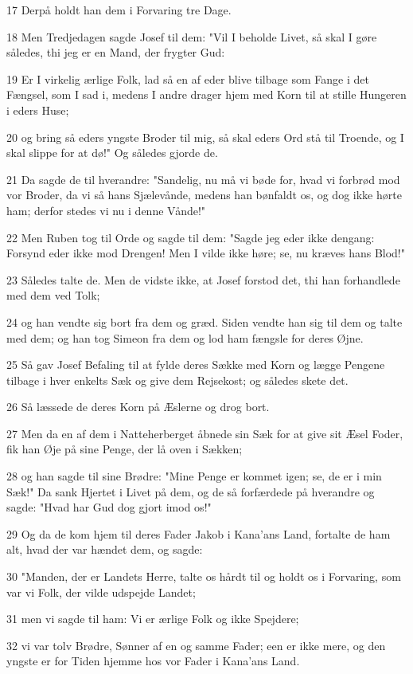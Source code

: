 \par 17 Derpå holdt han dem i Forvaring tre Dage.
\par 18 Men Tredjedagen sagde Josef til dem: "Vil I beholde Livet, så skal I gøre således, thi jeg er en Mand, der frygter Gud:
\par 19 Er I virkelig ærlige Folk, lad så en af eder blive tilbage som Fange i det Fængsel, som I sad i, medens I andre drager hjem med Korn til at stille Hungeren i eders Huse;
\par 20 og bring så eders yngste Broder til mig, så skal eders Ord stå til Troende, og I skal slippe for at dø!" Og således gjorde de.
\par 21 Da sagde de til hverandre: "Sandelig, nu må vi bøde for, hvad vi forbrød mod vor Broder, da vi så hans Sjælevånde, medens han bønfaldt os, og dog ikke hørte ham; derfor stedes vi nu i denne Vånde!"
\par 22 Men Ruben tog til Orde og sagde til dem: "Sagde jeg eder ikke dengang: Forsynd eder ikke mod Drengen! Men I vilde ikke høre; se, nu kræves hans Blod!"
\par 23 Således talte de. Men de vidste ikke, at Josef forstod det, thi han forhandlede med dem ved Tolk;
\par 24 og han vendte sig bort fra dem og græd. Siden vendte han sig til dem og talte med dem; og han tog Simeon fra dem og lod ham fængsle for deres Øjne.
\par 25 Så gav Josef Befaling til at fylde deres Sække med Korn og lægge Pengene tilbage i hver enkelts Sæk og give dem Rejsekost; og således skete det.
\par 26 Så læssede de deres Korn på Æslerne og drog bort.
\par 27 Men da en af dem i Natteherberget åbnede sin Sæk for at give sit Æsel Foder, fik han Øje på sine Penge, der lå oven i Sækken;
\par 28 og han sagde til sine Brødre: "Mine Penge er kommet igen; se, de er i min Sæk!" Da sank Hjertet i Livet på dem, og de så forfærdede på hverandre og sagde: "Hvad har Gud dog gjort imod os!"
\par 29 Og da de kom hjem til deres Fader Jakob i Kana'ans Land, fortalte de ham alt, hvad der var hændet dem, og sagde:
\par 30 "Manden, der er Landets Herre, talte os hårdt til og holdt os i Forvaring, som var vi Folk, der vilde udspejde Landet;
\par 31 men vi sagde til ham: Vi er ærlige Folk og ikke Spejdere;
\par 32 vi var tolv Brødre, Sønner af en og samme Fader; een er ikke mere, og den yngste er for Tiden hjemme hos vor Fader i Kana'ans Land.
